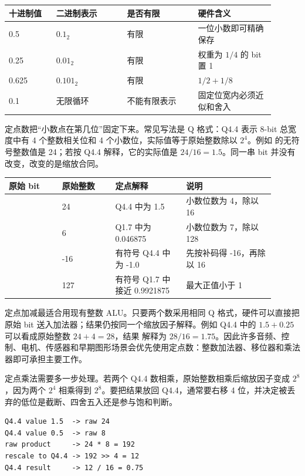\begin{longtable}{L{0.16\linewidth}L{0.24\linewidth}L{0.24\linewidth}L{0.26\linewidth}}
\toprule
十进制值 & 二进制表示 & 是否有限 & 硬件含义 \\
 & $0.1_2$ & 有限 & 一位小数即可精确保存 \\
0.25 & $0.01_2$ & 有限 & 权重为 $1/4$ 的 bit 置 1 \\
0.625 & $0.101_2$ & 有限 & $1/2+1/8$ \\
0.1 & 无限循环 & 不能有限表示 & 固定位宽内必须近似和舍入 \\
\bottomrule
\end{longtable}

定点数把“小数点在第几位”固定下来。常见写法是 Q 格式：Q4.4 表示 8-bit 总宽度中有 4 个整数相关位和 4 个小数位，实际值等于原始整数除以 $2^4$。例如  的无符号整数值是 24；若按 Q4.4 解释，它的实际值是 $24/16=1.5$。同一串 bit 并没有改变，改变的是缩放合同。

\begin{longtable}{L{0.18\linewidth}L{0.18\linewidth}L{0.24\linewidth}L{0.3\linewidth}}
\toprule
原始 bit & 原始整数 & 定点解释 & 说明 \\
\midrule
{} & 24 & Q4.4 中为 1.5 & 小数位数为 4，除以 16 \\
 & 6 & Q1.7 中为 0.046875 & 小数位数为 7，除以 128 \\
 & -16 & 有符号 Q4.4 中为 -1.0 & 先按补码得 -16，再除以 16 \\
 & 127 & 有符号 Q1.7 中接近 0.9921875 & 最大正值小于 1 \\
\bottomrule
\end{longtable}

定点加减最适合用现有整数 ALU。只要两个数采用相同 Q 格式，硬件可以直接把原始 bit 送入加法器；结果仍按同一个缩放因子解释。例如 Q4.4 中的 $1.5+0.25$ 可以看成原始整数 $24+4=28$，结果  解释为 $28/16=1.75$。因此许多音频、控制、电机、传感器和早期图形场景会优先使用定点数：整数加法器、移位器和乘法器即可承担主要工作。

定点乘法需要多一步处理。若两个 Q4.4 数相乘，原始整数相乘后缩放因子变成 $2^8$，因为两个 $2^4$ 相乘得到 $2^8$。要把结果放回 Q4.4，通常要右移 4 位，并决定被丢弃的低位是截断、四舍五入还是参与饱和判断。

\begin{lstlisting}
Q4.4 value 1.5  -> raw 24
Q4.4 value 0.5  -> raw 8
raw product     -> 24 * 8 = 192
rescale to Q4.4 -> 192 >> 4 = 12
Q4.4 result     -> 12 / 16 = 0.75
\end{lstlisting}

